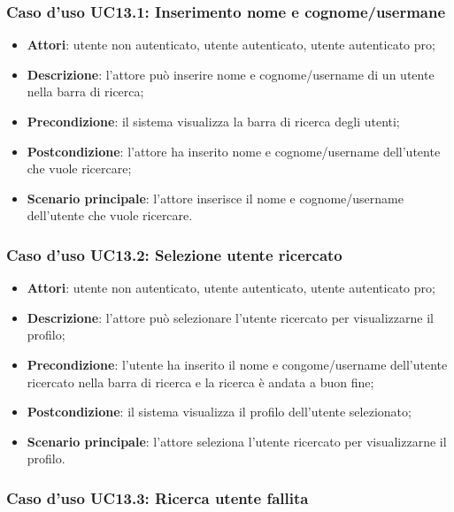 \subsubsection{Caso d'uso UC13.1: Inserimento nome e cognome/usermane}

\begin{itemize}
	\item \textbf{Attori}: utente non autenticato, utente autenticato, utente autenticato pro;
	\item \textbf{Descrizione}: l'attore può inserire nome e cognome/username di un utente nella barra di ricerca;
	\item \textbf{Precondizione}: il sistema visualizza la barra di ricerca degli utenti;
	\item \textbf{Postcondizione}: l'attore ha inserito nome e cognome/username dell'utente che vuole ricercare;
	\item \textbf{Scenario principale}: l'attore inserisce il nome e cognome/username dell'utente che vuole ricercare.
\end{itemize}

\subsubsection{Caso d'uso UC13.2: Selezione utente ricercato}

\begin{itemize}
	\item \textbf{Attori}: utente non autenticato, utente autenticato, utente autenticato pro;
	\item \textbf{Descrizione}: l'attore può selezionare l'utente ricercato per visualizzarne il profilo;
	\item \textbf{Precondizione}: l'utente ha inserito il nome e congome/username dell'utente ricercato nella barra di ricerca e la ricerca è andata a buon fine;
	\item \textbf{Postcondizione}: il sistema visualizza il profilo dell'utente selezionato;
	\item \textbf{Scenario principale}: l'attore seleziona l'utente ricercato per visualizzarne il profilo.
\end{itemize}

\subsubsection{Caso d'uso UC13.3: Ricerca utente fallita}

